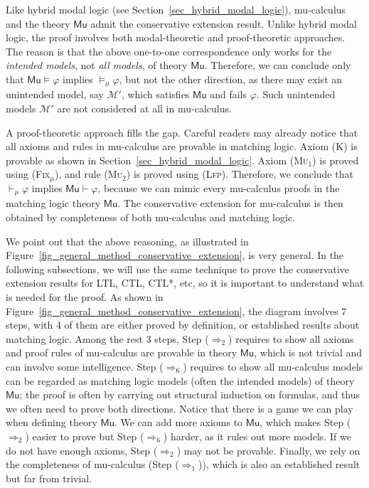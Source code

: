 \documentclass[letter,12pt]{article}
\newcommand{\MM}{\mathcal{M}}
\newcommand{\MLMu}{\mathsf{Mu}}
\newcommand{\prule}[1]{\textsc{(#1)}}
\newcommand{\Lfp}{\prule{Lfp}\xspace}
\newcommand{\Fixmu}{\prule{Fix$_\mu$}\xspace}
\begin{document}
Like hybrid modal logic (see Section~\ref{sec_hybrid_modal_logic}), 
mu-calculus and the theory $\MLMu$
admit the conservative extension result.
Unlike hybrid modal logic, the proof involves
both modal-theoretic and proof-theoretic approaches.
The reason is that the above one-to-one correspondence only works for
the \emph{intended models}, not \emph{all models}, of theory $\MLMu$.
Therefore, we can conclude only
that $\MLMu \vDash \varphi$ implies $\vDash_\mu \varphi$,
but not the other direction, as there may exist an unintended model, say $\MM'$,
which satisfies $\MLMu$ and fails $\varphi$.
Such unintended models $\MM'$ are not considered at all in mu-calculus.

A proof-theoretic approach fills the gap.
Careful readers may already notice that 
all axioms and rules in mu-calculus are provable in matching logic.
Axiom \prule{K} is provable as shown in Section~\ref{sec_hybrid_modal_logic}.
Axiom \prule{Mu$_1$} is proved using \Fixmu,
and rule \prule{Mu$_2$} is proved using \Lfp.
Therefore, we conclude that $\vdash_\mu \varphi$ implies $\MLMu \vdash \varphi$,
because we can mimic every mu-calculus proofs in the matching logic theory $\MLMu$.
The conservative extension for mu-calculus is then obtained by 
completeness of both mu-calculus and matching logic.

We point out that the above reasoning,
as illustrated in Figure~\ref{fig_general_method_conservative_extension},
is very general.
In the following subsections, 
we will use the same technique to prove
the conservative extension results for LTL, CTL, CTL*, etc,
so it is important to understand what is needed for the proof.
As shown in Figure~\ref{fig_general_method_conservative_extension},
the diagram involves 7 steps, with 4 of them are either proved by definition,
or established results about matching logic.
Among the rest 3 steps,
Step ($\Longrightarrow_2$) requires to show all axioms and proof rules of mu-calculus
are provable in theory $\MLMu$, 
which is not trivial and can involve some intelligence.
Step ($\Longrightarrow_6$) requires to show all mu-calculus models can be regarded as
matching logic models (often the intended models) of theory $\MLMu$;
the proof is often by carrying out structural induction on formulas,
and thus we often need to prove both directions.
Notice that there is a game we can play when defining theory $\MLMu$.
We can add more axioms to $\MLMu$, which makes Step ($\Longrightarrow_2$) easier to prove
but Step ($\Longrightarrow_6$) harder, as it rules out more models.
If we do not have enough axioms, Step ($\Longrightarrow_2$) may not be provable.
Finally, we rely on the completeness of mu-calculus (Step ($\Longrightarrow_1$)),
which is also an established result but far from trivial.
\end{document}
